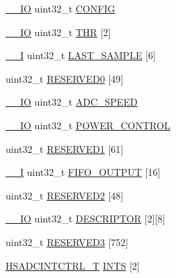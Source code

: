 \begin{DoxyCompactItemize}
\hyperlink{core__sc300_8h_aec43007d9998a0a0e01faede4133d6be}{\+\_\+\+\_\+\+IO} uint32\+\_\+t \hyperlink{struct_l_p_c___h_s_a_d_c___t_aed40378e2ce292435df51ff247d0cb78}{C\+O\+N\+F\+IG}
\item 
\hyperlink{core__sc300_8h_aec43007d9998a0a0e01faede4133d6be}{\+\_\+\+\_\+\+IO} uint32\+\_\+t \hyperlink{struct_l_p_c___h_s_a_d_c___t_aa7c4455d20587c36347ecc9290ce8156}{T\+HR} \mbox{[}2\mbox{]}
\item 
\hyperlink{core__sc300_8h_af63697ed9952cc71e1225efe205f6cd3}{\+\_\+\+\_\+I} uint32\+\_\+t \hyperlink{struct_l_p_c___h_s_a_d_c___t_a044765cf52d32a129a87488f24431d38}{L\+A\+S\+T\+\_\+\+S\+A\+M\+P\+LE} \mbox{[}6\mbox{]}
\item 
uint32\+\_\+t \hyperlink{struct_l_p_c___h_s_a_d_c___t_a4cc7c35ca8a5a97a6a02f2d000b43dd8}{R\+E\+S\+E\+R\+V\+E\+D0} \mbox{[}49\mbox{]}
\item 
\hyperlink{core__sc300_8h_aec43007d9998a0a0e01faede4133d6be}{\+\_\+\+\_\+\+IO} uint32\+\_\+t \hyperlink{struct_l_p_c___h_s_a_d_c___t_a54d508ec691447ed4910f6bb5baf2caa}{A\+D\+C\+\_\+\+S\+P\+E\+ED}
\item 
\hyperlink{core__sc300_8h_aec43007d9998a0a0e01faede4133d6be}{\+\_\+\+\_\+\+IO} uint32\+\_\+t \hyperlink{struct_l_p_c___h_s_a_d_c___t_a8f1df094209082e7487a99d38134617a}{P\+O\+W\+E\+R\+\_\+\+C\+O\+N\+T\+R\+OL}
\item 
uint32\+\_\+t \hyperlink{struct_l_p_c___h_s_a_d_c___t_a84f2c6998a2176c0569105c2f1bd98f0}{R\+E\+S\+E\+R\+V\+E\+D1} \mbox{[}61\mbox{]}
\item 
\hyperlink{core__sc300_8h_af63697ed9952cc71e1225efe205f6cd3}{\+\_\+\+\_\+I} uint32\+\_\+t \hyperlink{struct_l_p_c___h_s_a_d_c___t_a82fbcc2d59bed593c8aae343d1756d1e}{F\+I\+F\+O\+\_\+\+O\+U\+T\+P\+UT} \mbox{[}16\mbox{]}
\item 
uint32\+\_\+t \hyperlink{struct_l_p_c___h_s_a_d_c___t_ab15d2c602a9db2c5cd31a6700221f993}{R\+E\+S\+E\+R\+V\+E\+D2} \mbox{[}48\mbox{]}
\item 
\hyperlink{core__sc300_8h_aec43007d9998a0a0e01faede4133d6be}{\+\_\+\+\_\+\+IO} uint32\+\_\+t \hyperlink{struct_l_p_c___h_s_a_d_c___t_a8a48f3becc3cad25f2bd881b0ee03209}{D\+E\+S\+C\+R\+I\+P\+T\+OR} \mbox{[}2\mbox{]}\mbox{[}8\mbox{]}
\item 
uint32\+\_\+t \hyperlink{struct_l_p_c___h_s_a_d_c___t_af0f9d49ab8930af430fefd8024b38f87}{R\+E\+S\+E\+R\+V\+E\+D3} \mbox{[}752\mbox{]}
\item 
\hyperlink{struct_h_s_a_d_c_i_n_t_c_t_r_l___t}{H\+S\+A\+D\+C\+I\+N\+T\+C\+T\+R\+L\+\_\+T} \hyperlink{struct_l_p_c___h_s_a_d_c___t_af7673c407512853f680e3fc58dca032a}{I\+N\+TS} \mbox{[}2\mbox{]}
\end{DoxyCompactItemize}


